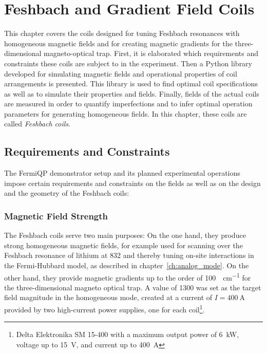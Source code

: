 \renewcommand{\imagepath}{../40-coils/img}

\chapter{Feshbach and Gradient Field Coils}\label{ch:coils}
This chapter covers the coils designed for tuning Feshbach resonances with homogeneous magnetic fields and for creating magnetic gradients for the three-dimensional magneto-optical trap. First, it is elaborated which requirements and constraints these coils are subject to in the experiment. Then a Python library developed for simulating magnetic fields and operational properties of coil arrangements is presented. This library is used to find optimal coil specifications as well as to simulate their properties and fields. Finally, fields of the actual coils are measured in order to quantify imperfections and to infer optimal operation parameters for generating homogeneous fields. In this chapter, these coils are called \textit{Feshbach coils}.

\section{Requirements and Constraints}
The FermiQP demonstrator setup and its planned experimental operations impose certain requirements and constraints on the fields as well as on the design and the geometry of the Feshbach coils:

\subsection*{Magnetic Field Strength}
The Feshbach coils serve two main purposes: On the one hand, they produce strong homogeneous magnetic fields, for example used for scanning over the Feshbach resonance of lithium at \SI{832}{\gauss} and thereby tuning on-site interactions in the Fermi-Hubbard model, as described in chapter~\ref{ch:analog_mode}. On the other hand, they provide magnetic gradients up to the order of \SI[]{100}{\gauss\per\centi\meter} for the three-dimensional magneto optical trap. A value of \SI{1300}{\gauss} was set as the target field magnitude in the homogeneous mode, created at a current of $I = \SI{400}{\ampere}$ provided by two high-current power supplies, one for each coil\footnote{Delta Elektronika SM 15-400 with a maximum output power of \SI[]{6}{\kilo\watt}, voltage up to \SI[]{15}{\volt}, and current up to \SI[]{400}{\ampere}}.

